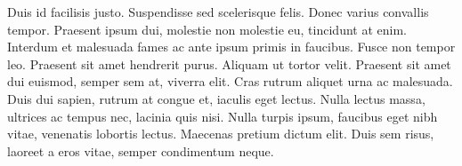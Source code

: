 Duis id facilisis justo. Suspendisse sed scelerisque felis. Donec varius convallis tempor. Praesent ipsum dui, molestie non molestie eu, tincidunt at enim. Interdum et malesuada fames ac ante ipsum primis in faucibus. Fusce non tempor leo. Praesent sit amet hendrerit purus. Aliquam ut tortor velit. Praesent sit amet dui euismod, semper sem at, viverra elit. Cras rutrum aliquet urna ac malesuada. Duis dui sapien, rutrum at congue et, iaculis eget lectus. Nulla lectus massa, ultrices ac tempus nec, lacinia quis nisi. Nulla turpis ipsum, faucibus eget nibh vitae, venenatis lobortis lectus. Maecenas pretium dictum elit. Duis sem risus, laoreet a eros vitae, semper condimentum neque.
